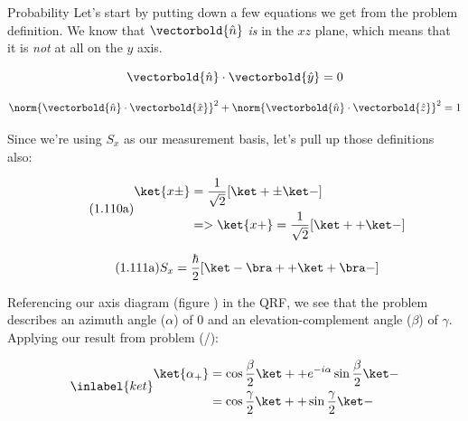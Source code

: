 \begin{answer}

  \begin{answerpart}{Probability}
    Let's start by putting down a few equations we get from the
    problem definition.  We know that $\vectorbold{\hat{n}}$ \emph{is}
    in the $xz$ plane, which means that it is \emph{not} at all on the
    $y$ axis.

    \begin{equation}
      \vectorbold{\hat{n}} \cdot \vectorbold{\hat{y}} = 0
    \end{equation}

    \begin{equation}
      \norm{ \vectorbold{\hat{n}} \cdot \vectorbold{\hat{x}}}^2
      + \norm{\vectorbold{\hat{n}} \cdot \vectorbold{\hat{z}}}^2
      = 1
    \end{equation}

    Since we're using $S_x$ as our measurement basis, let's pull up
    those definitions also:

    \begin{equation*}
      \tag{1.110a}
      \begin{split}
        \ket{x\pm} &= \frac{1}{\sqrt{2}} [\ket + \pm \ket -]\\
        &=> \ket{x+} = \frac{1}{\sqrt{2}} [\ket + + \ket -]
      \end{split}
    \end{equation*}

    \begin{equation*}
      \tag{1.111a}
      S_x = \frac{\hbar}{2} [\ket - \bra + + \ket + \bra - ]
    \end{equation*}

    Referencing our axis diagram (figure ) in the QRF,
    we see that the problem describes an azimuth angle ($\alpha$) of
    $0$ and an elevation-complement angle ($\beta$) of $\gamma$.
    Applying our result from problem 
    (/):

    \begin{equation}
      \inlabel{ket}
      \begin{split}
        \ket{\alpha_+}
        &= \cos{\frac{\beta}{2}} \ket + + e^{-i\alpha}\sin{\frac{\beta}{2}} \ket -\\
        &= \cos{\frac{\gamma}{2}} \ket + + \sin{\frac{\gamma}{2}} \ket -\\
      \end{split}
    \end{equation}


\end{answerpart}
\end{answer}
